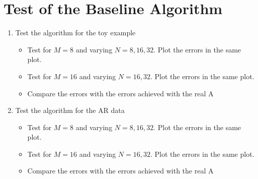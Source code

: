 \section{Test of the Baseline Algorithm}
\begin{enumerate}
\item Test the algorithm for the toy example
	\begin{itemize}
	\item Test for $M = 8$ and varying $N = 8, 16, 32$. Plot the errors in the same plot.
	\item Test for $M = 16$ and varying $N = 16, 32$. Plot the errors in the same plot.
	\item Compare the errors with the errors achieved with the real A
	\end{itemize}	 
\item Test the algorithm for the AR data
	\begin{itemize}
	\item Test for $M = 8$ and varying $N = 8, 16, 32$. Plot the errors in the same plot.
	\item Test for $M = 16$ and varying $N = 16, 32$. Plot the errors in the same plot.
	\item Compare the errors with the errors achieved with the real A
	\end{itemize}	
\end{enumerate}   
